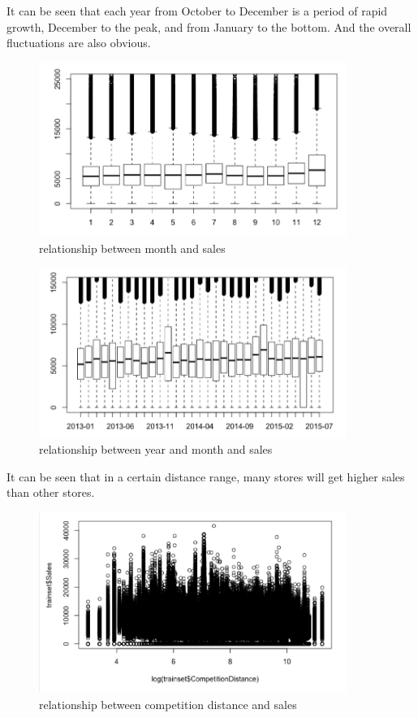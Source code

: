 \documentclass[12pt]{article}
\begin{document}
\newpage
It can be seen that each year from October to December  is a period of rapid growth, December to the peak, and from January to the bottom. And the overall fluctuations are also obvious.

\begin{figure}[h]
\centering
\includegraphics[width=10cm]{image/relationship_between_month_and_sales.png}
\caption{relationship between month and sales}
\label{fig6}
\end{figure}



\begin{figure}[h]
\centering
\includegraphics[width=10cm]{image/relationship_between_year_month_and_sales.png}
\caption{relationship between year and month and sales}
\label{fig7}
\end{figure}




\newpage 
It can be seen that in a certain distance range, many stores will get higher sales than other stores.
\begin{figure}

\centering
\includegraphics[width=10cm]{image/relationship_between_day_of_competition_distance_and_sales.png}
\caption{relationship between competition distance and sales}
\label{fig8}
\end{figure}
\end{document}
